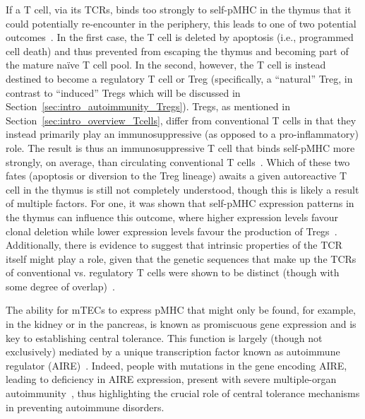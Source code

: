 If a T cell, via its TCRs, binds too strongly to self-pMHC in the thymus that it could potentially re-encounter in the periphery, this leads to one of two potential outcomes~\cite{kondo2019thymus}. In the first case, the T cell is deleted by apoptosis (i.e., programmed cell death) and thus prevented from escaping the thymus and becoming part of the mature na\"{i}ve T cell pool. In the second, however, the T cell is instead destined to become a regulatory T cell or Treg (specifically, a ``natural'' Treg, in contrast to ``induced'' Tregs which will be discussed in Section~\ref{sec:intro_autoimmunity_Tregs}). Tregs, as mentioned in Section~\ref{sec:intro_overview_Tcells}, differ from conventional T cells in that they instead primarily play an immunosuppressive (as opposed to a pro-inflammatory) role. The result is thus an immunosuppressive T cell that binds self-pMHC more strongly, on average, than circulating conventional T cells~\cite{tanaka2010graded,killebrew2011self,moran2011t,li2016t}. Which of these two fates (apoptosis or diversion to the Treg lineage) awaits a given autoreactive T cell in the thymus is still not completely understood, though this is likely a result of multiple factors. For one, it was shown that self-pMHC expression patterns in the thymus can influence this outcome, where higher expression levels favour clonal deletion while lower expression levels favour the production of Tregs~\cite{malhotra2016tolerance}. Additionally, there is evidence to suggest that intrinsic properties of the TCR itself might play a role, given that the genetic sequences that make up the TCRs of conventional vs. regulatory T cells were shown to be distinct (though with some degree of overlap)~\cite{hsieh2004recognition,wong2007adaptation,savage2020regulatory}.

The ability for mTECs to express pMHC that might only be found, for example, in the kidney or in the pancreas, is known as promiscuous gene expression and is key to establishing central tolerance. This function is largely (though not exclusively) mediated by a unique transcription factor known as autoimmune regulator (AIRE)~\cite{derbinski2005promiscuous,kyewski2006central}. Indeed, people with mutations in the gene encoding AIRE, leading to deficiency in AIRE expression, present with severe multiple-organ autoimmunity~\cite{betterle1998autoimmune,anderson2005cellular,besnard2021aire}, thus highlighting the crucial role of central tolerance mechanisms in preventing autoimmune disorders. 



